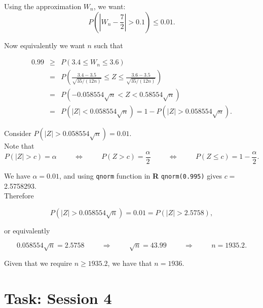\documentclass[
]{book}
\begin{document}
Using the approximation \(W_n\), we want:\\

\[ P \left(\left| W_n - \frac{7}{2} \right| > 0.1 \right) \leq  0.01. \]

Now equivalently we want \(n\) such that

\begin{eqnarray*}
0.99 &\geq & P(3.4 \leq W_n \leq 3.6) \\
&= & P \left( \frac{3.4 -3.5}{\sqrt{35/(12n)}} \leq Z \leq  \frac{3.6 -3.5}{\sqrt{35/(12n)}} \right) \\
&=& P \left( - 0.058554 \sqrt{n} < Z < 0.58554 \sqrt{n} \right)  \\
&=& P(|Z| < 0.058554 \sqrt{n}) = 1- P(|Z| > 0.058554 \sqrt{n}). \end{eqnarray*}

Consider \(P(|Z| > 0.058554 \sqrt{n}) =0.01\).\\
Note that\\

\[ P(|Z| >c) =\alpha \hspace{1cm} \Leftrightarrow \hspace{1cm} P (Z >c) = \frac{\alpha}{2} \hspace{1cm} \Leftrightarrow \hspace{1cm} P (Z \leq c) = 1-\frac{\alpha}{2}. \]

We have \(\alpha =0.01\), and using \texttt{qnorm} function in \textbf{R} \texttt{qnorm(0.995)} gives \(c =\) 2.5758293.\\
Therefore

\[ P(|Z| > 0.058554 \sqrt{n}) =0.01 = P(|Z|>2.5758), \]

or equivalently

\[0.058554 \sqrt{n} = 2.5758 \hspace{1cm} \Rightarrow \hspace{1cm} \sqrt{n} = 43.99 \hspace{1cm} \Rightarrow \hspace{1cm} n = 1935.2. \]

Given that we require \(n \geq 1935.2\), we have that \(n=1936\).

\hfill\break

\hypertarget{Sec_clt:lab}{%
\section*{\texorpdfstring{{\textbf{Task: Session 4}}}{Task: Session 4}}\label{Sec_clt:lab}}
\end{document}
